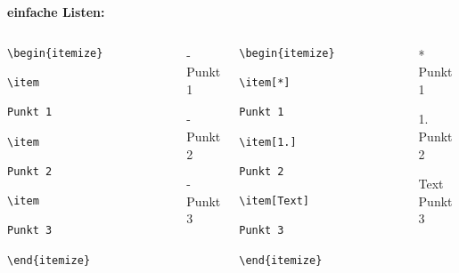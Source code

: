 \documentclass["WS\space 16-17\space -\space LaTeX-Kurs\space -\space Praesentation\space -\space 2.tex"]{subfiles}
\begin{document}
\begin{frame}[fragile]
    \textbf{\large einfache Listen:}
    \begin{columns}[onlytextwidth,t]
            \Code*
                \begin{lstlisting}[gobble=20]
                    \begin{itemize}
                        \item
                            Punkt 1
                        \item
                            Punkt 2
                        \item
                            Punkt 3
                    \end{itemize}
                \end{lstlisting}
            \Ausgabe\vspace{-0.2cm}
                \begin{outputbox}
                    \begin{itemize}
                        \item[-]
                            Punkt 1
                        \item[-]
                            Punkt 2
                        \item[-]
                            Punkt 3
                    \end{itemize}
                \end{outputbox}
            \Code*
                \begin{lstlisting}[gobble=20]
                    \begin{itemize}
                        \item[*]
                            Punkt 1
                        \item[1.]
                            Punkt 2
                        \item[Text]
                            Punkt 3
                    \end{itemize}
                \end{lstlisting}
            \Ausgabe\vspace{-0.2cm}
                \begin{outputbox}
                    \begin{itemize}
                        \item[*]
                            Punkt 1
                        \item[1.]
                            Punkt 2
                        \item[Text]
                            Punkt 3
                    \end{itemize}
                \end{outputbox}
    \end{columns}
\end{frame}
\end{document}
